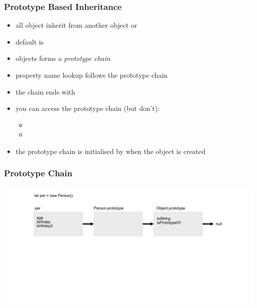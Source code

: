 \begin{frame}[fragile] \frametitle{Prototype Based Inheritance}

\begin{itemize}
  \item all object inherit from another object or 
  \item default is 
  \item objects forms a \emph{prototype chain}
  \item property name lookup follows the prototype chain
  \item the chain ends with 
  \item you can access the prototype chain (but don't):
  \begin{itemize}
    \item {}
    \item {}
  \end{itemize}
  \item the prototype chain is initialised by  when the object is created
\end{itemize}
\end{frame}

\begin{frame}[fragile]
\frametitle{Prototype Chain}
  \centering
  \includegraphics[width=14cm]{img/prototype_chain}

\end{frame}

